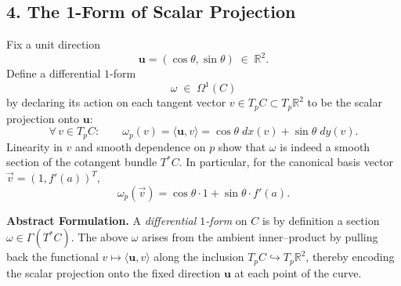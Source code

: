 \documentclass[12pt]{article}
\theoremstyle{definitionstyle}
\newcommand{\R}{\mathbb{R}}
\begin{document}
\subsection*{4. The 1-Form of Scalar Projection}
Fix a unit direction
\[
\mathbf{u}=(\cos\theta,\sin\theta)\;\in\;\R^2.
\]
Define a differential \(1\)-form
\[
\omega\;\in\;\Omega^1(C)
\]
by declaring its action on each tangent vector \(v\in T_pC\subset T_p\R^2\) to be the scalar
projection onto \(\mathbf{u}\):
\[
\forall\,v\in T_pC:\qquad
\omega_p(v)
=\langle \mathbf{u},v\rangle
=\cos\theta\;dx(v)
+\sin\theta\;dy(v).
\]
Linearity in \(v\) and smooth dependence on \(p\) show that \(\omega\) is indeed a smooth
section of the cotangent bundle \(T^*C\).  In particular, for the canonical basis vector
\(\vec v=(1,f'(a))^T\),
\[
\omega_p(\vec v)
=\cos\theta\cdot 1
+\sin\theta\cdot f'(a).
\]

\vspace{1ex}\noindent
\textbf{Abstract Formulation.}  A \emph{differential \(1\)-form} on \(C\) is by definition
a section \(\omega\in\Gamma(T^*C)\).  The above \(\omega\) arises from the ambient
inner–product by pulling back the functional \(v\mapsto\langle\mathbf{u},v\rangle\)
along the inclusion \(T_pC\hookrightarrow T_p\R^2\), thereby encoding the scalar
projection onto the fixed direction \(\mathbf{u}\) at each point of the curve.

	
\end{document}
